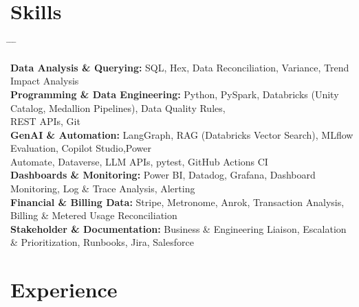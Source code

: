 \documentclass[10pt, letterpaper]{article}
\begin{document}
    \section{Skills}
        \begin{tabbing}
    \hspace{5.8cm} \= \hspace{4cm} \= \hspace{4cm} \= \kill %

    \textbf{Data Analysis \& Querying:} \> SQL, Hex, Data Reconciliation, Variance, Trend Impact Analysis\\

    \textbf{Programming \& Data Engineering:} \> Python, PySpark, Databricks (Unity Catalog, Medallion Pipelines), Data Quality Rules,\\ \> REST APIs, Git\\

    \textbf{GenAI \& Automation:} \> LangGraph, RAG (Databricks Vector Search), MLflow Evaluation, Copilot Studio,Power\\ \> Automate, Dataverse, LLM APIs, pytest, GitHub Actions CI\\

    \textbf{Dashboards \& Monitoring:} \> Power BI, Datadog, Grafana, Dashboard Monitoring, Log \& Trace Analysis, Alerting\\

    \textbf{Financial \& Billing Data:} \> Stripe, Metronome, Anrok, Transaction Analysis, Billing \& Metered Usage Reconciliation\\

    \textbf{Stakeholder \& Documentation:} \> Business \& Engineering Liaison, Escalation \& Prioritization, Runbooks, Jira, Salesforce
\end{tabbing}

    \section{Experience}
\end{document}
